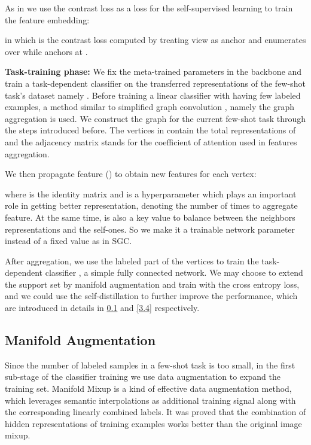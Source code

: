 \documentclass[conference]{IEEEtran}
\begin{document}
As in \cite{tian2019contrastive} we use the contrast loss as a loss for the self-supervised learning to train the feature embedding:

in which  is the contrast loss computed by treating view  as anchor and enumerates over  while  anchors at .


\textbf{Task-training phase:} We ﬁx the meta-trained parameters  in the backbone and train a task-dependent classiﬁer  on the transferred representations of the few-shot task’s dataset namely . Before training a linear classiﬁer with  having few labeled examples, a method similar to simpliﬁed graph convolution \cite{wu2019simplifying}, namely the graph aggregation is used. We construct the graph  for the current few-shot task through the steps introduced before. The vertices in  contain the total representations of  and the adjacency matrix stands for the coefficient of attention used in features aggregation.


We then propagate feature (\cite{wu2019simplifying}) to obtain new features for each vertex:

where  is the identity matrix and  is a hyperparameter which plays an important role in getting better representation, denoting the number of times to aggregate feature. At the same time,  is also a key value to balance between the neighbors representations and the self-ones. So we make it a trainable network parameter instead of a fixed value as in SGC.


After aggregation, we use the labeled part of the vertices to train the task-dependent classifier , a simple fully connected network. We may choose to extend the support set by manifold augmentation and train with the cross entropy loss, and we could use the self-distillation to further improve the performance, which are introduced in details in \ref{3.3} and \ref{3.4} respectively.

\subsection{Manifold Augmentation}\label{3.3}
Since the number of labeled samples in a few-shot task is too small, in the first sub-stage of the classifier training we use data augmentation to expand the training set. Manifold Mixup\cite{verma2018manifold} is a kind of effective data augmentation method, which leverages semantic interpolations as additional training signal along with the corresponding linearly combined labels. It was proved that the combination of hidden representations of training examples works better than the original image mixup. 
\end{document}
